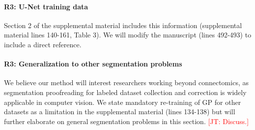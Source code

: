 \documentclass[10pt,twocolumn,letterpaper]{article}
\newcommand{\JT}[1]{\textcolor{red}{[JT: #1]}}
\begin{document}
\begin{table}[h]
\caption{Forced Choice User Experiment in adapted Rand Error (aRE) metric (lower is better). Novices and experts using GP perform better than using FP.}
\label{tab:randerror}
\end{table}



\paragraph{R3: U-Net training data} Section 2 of the supplemental material includes this information (supplemental material lines 140-161, Table 3). We will modify the manuscript (lines 492-493) to include a direct reference.

\paragraph{R3: Generalization to other segmentation problems} We believe our method will interest researchers working beyond connectomics, as segmentation proofreading for labeled dataset collection and correction is widely applicable in computer vision. We state mandatory re-training of GP for other datasets as a limitation in the supplemental material (lines 134-138) but will further elaborate on general segmentation problems in this section. \JT{Discuss.}
\end{document}
